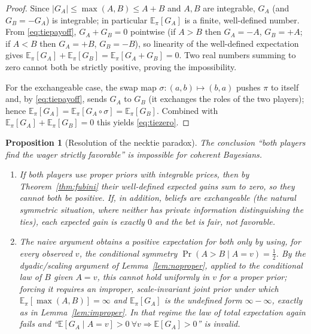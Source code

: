 \documentclass{amsart}
\theoremstyle{plain}
\newtheorem{proposition}{Proposition}
\theoremstyle{definition}
\begin{document}
\begin{proof}
Since $|G_A|\le\max(A,B)\le A+B$ and $A,B$ are integrable, $G_A$ (and
$G_B=-G_A$) is integrable; in particular $\mathbb E_\pi[G_A]$ is a finite,
well-defined number. From \eqref{eq:tiepayoff}, $G_A+G_B=0$ pointwise (if $A>B$
then $G_A=-A$, $G_B=+A$; if $A<B$ then $G_A=+B$, $G_B=-B$), so linearity of the
well-defined expectation gives
$\mathbb E_\pi[G_A]+\mathbb E_\pi[G_B]=\mathbb E_\pi[G_A+G_B]=0$. Two real numbers
summing to zero cannot both be strictly positive, proving the impossibility.

For the exchangeable case, the swap map $\sigma:(a,b)\mapsto(b,a)$ pushes $\pi$
to itself and, by \eqref{eq:tiepayoff}, sends $G_A$ to $G_B$ (it exchanges the
roles of the two players); hence
$\mathbb E_\pi[G_A]=\mathbb E_\pi[G_A\circ\sigma]=\mathbb E_\pi[G_B]$. Combined
with $\mathbb E_\pi[G_A]+\mathbb E_\pi[G_B]=0$ this yields \eqref{eq:tiezero}.
\end{proof}

\begin{proposition}[Resolution of the necktie paradox]\label{prop:tie}
The conclusion ``both players find the wager strictly favorable'' is impossible
for coherent Bayesians.
\begin{enumerate}
\item If both players use proper priors with integrable prices, then by
Theorem~\ref{thm:fubini} their well-defined expected gains sum to zero, so they
cannot both be positive. If, in addition, beliefs are exchangeable (the natural
symmetric situation, where neither has private information distinguishing the
ties), each expected gain is exactly $0$ and the bet is fair, not favorable.
\item The naive argument obtains a positive expectation for both only by using,
for every observed $v$, the conditional symmetry
$\Pr(A>B\mid A=v)=\tfrac12$. By the dyadic/scaling argument of
Lemma~\ref{lem:noproper}, applied to the conditional law of $B$ given $A=v$, this
cannot hold uniformly in $v$ for a proper prior; forcing it requires an improper,
scale-invariant joint prior under which $\mathbb E_\pi[\max(A,B)]=\infty$ and
$\mathbb E_\pi[G_A]$ is the undefined form $\infty-\infty$, exactly as in
Lemma~\ref{lem:improper}. In that regime the law of total expectation again
fails and ``$\mathbb E[G_A\mid A=v]>0\ \forall v \Rightarrow \mathbb E[G_A]>0$''
is invalid.
\end{enumerate}
\end{proposition}
\end{document}
